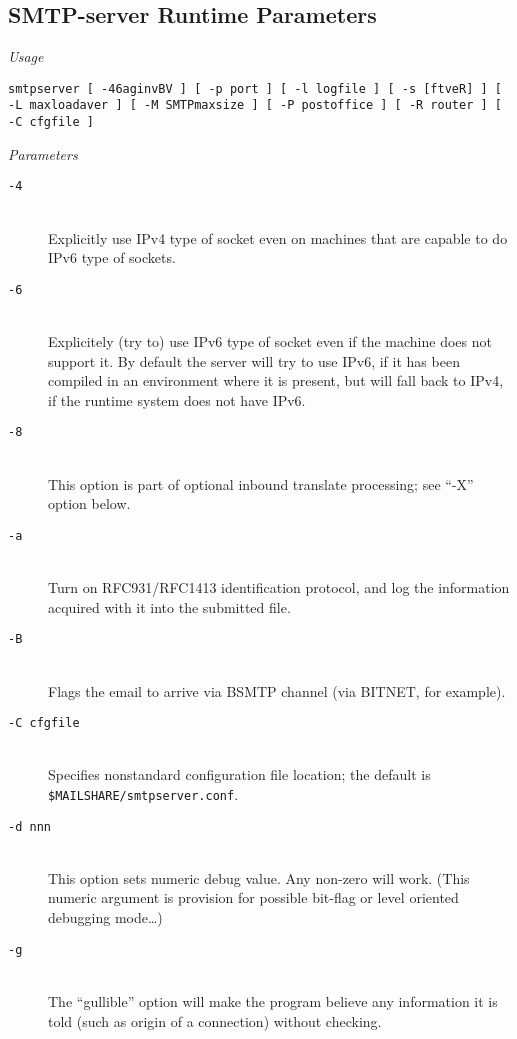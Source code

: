 \subsection{SMTP-server Runtime Parameters}

{\em Usage}

{\tt smtpserver [ -46aginvBV ] [ -p port ] [ -l logfile ] [ -s [ftveR] ] [ -L maxloadaver ] [ -M SMTPmaxsize ] [ -P postoffice ] [ -R router ] [ -C cfgfile ]}

{\em Parameters}

\begin{description}
\item[{\tt -4}] \mbox{} \\
Explicitly use IPv4 type of socket even on machines that are capable to do
IPv6 type of sockets.

\item[{\tt -6}] \mbox{} \\
Explicitely (try to) use IPv6 type of socket even if the machine does not
support it.
By default the server will try to use IPv6, if it has been compiled in
an environment where it is present, but will fall back to IPv4, if
the runtime system does not have IPv6.

\item[{\tt -8}] \mbox{} \\
This option is part of optional inbound translate processing;
see ``-X'' option below.

\item[{\tt -a}] \mbox{} \\
Turn on RFC931/RFC1413 identification protocol, and log the information
acquired with it into the submitted file.

\item[{\tt -B}] \mbox{} \\
Flags the email to arrive via BSMTP channel (via BITNET, for example).

\item[{\tt -C cfgfile}] \mbox{} \\
Specifies nonstandard configuration file location; the default is 
{\tt \$MAILSHARE/smtpserver.conf}.

\item[\tt -d nnn] \mbox{} \\
This option sets numeric debug value.  Any non-zero will work.
(This numeric argument is provision for possible bit-flag or
level oriented debugging mode\ldots)

\item[{\tt -g}] \mbox{} \\
The ``gullible'' option will make the program believe any information
it is told (such as origin of a connection) without checking.


\end{description}
